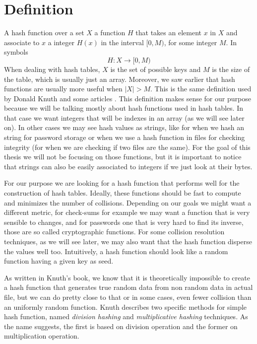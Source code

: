 \bigskip

\section{Definition}

A hash function over a set \( X \) a function \( H \) that takes an element \( x \) in \( X \) and associate to \( x \) a integer \( H(x) \) in the interval \( [0,M) \), for some integer \( M \). In symbols
\[ H: X \rightarrow [0, M) \]
When dealing with hash tables, \( X \) is the set of possible keys and \( M \) is the size of the table, which is usually just an array. Moreover, we saw earlier that hash functions are usually more useful when \( |X| > M \). This is the same definition used by Donald Knuth \citep{TAOCP3} and some articles \citep{RobinHoodHashing}. This definition makes sense for our purpose because we will be talking mostly about hash functions used in hash tables. In that case we want integers that will be indexes in an array (as we will see later on). In other cases we may see hash values as strings, like for when we hash an string for password storage or when we use a hash function in files for checking integrity (for when we are checking if two files are the same). For the goal of this thesis we will not be focusing on those functions, but it is important to notice that strings can also be easily associated to integers if we just look at their bytes.

For our purpose we are looking for a hash function that performs well for the construction of hash tables. Ideally, these functions should be fast to compute and minimizes the number of collisions. Depending on our goals we might want a different metric, for check-sums for example we may want a function that is very sensible to changes, and for passwords one that is very hard to find its inverse, those are so called cryptographic functions. For some collision resolution techniques, as we will see later, we may also want that the hash function disperse the values well too. Intuitively, a hash function should look like a random function having a given key as seed.

As written in Knuth's book, we know that it is theoretically impossible to create a hash function that generates true random data from non random data in actual file, but we can do pretty close to that or in some cases, even fewer collision than an uniformly random function. Knuth describes two specific methods for simple hash function, named \textit{division hashing} and \textit{multiplicative hashing} techniques. As the name suggests, the first is based on division operation and the former on multiplication operation.

